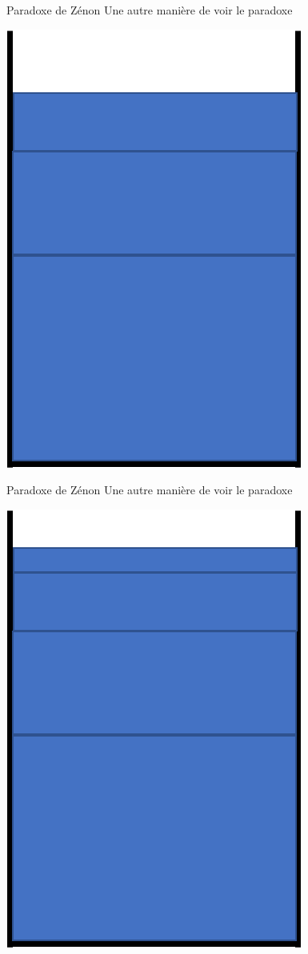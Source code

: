 \documentclass[11pt]{beamer}
\begin{document}
\begin{frame}{Paradoxe de Zénon}
Une autre manière de voir le paradoxe
\begin{center}
	\includegraphics[scale=0.5]{glass3.png}
\end{center}
\end{frame}
\begin{frame}{Paradoxe de Zénon}
Une autre manière de voir le paradoxe
\begin{center}
	\includegraphics[scale=0.5]{glass4.png}
\end{center}
\end{frame}
\end{document}
